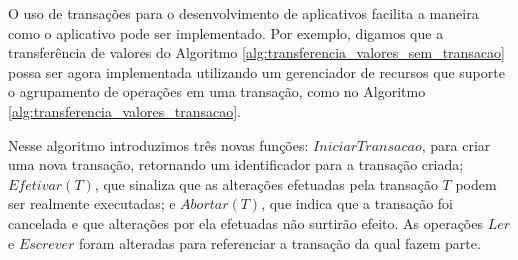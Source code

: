 \documentclass[11pt,twoside,a4paper]{book}
\begin{document}

O uso de transações para o desenvolvimento de aplicativos facilita a maneira como o aplicativo pode ser implementado. Por exemplo, digamos que a transferência de valores do Algoritmo \ref{alg:transferencia_valores_sem_transacao} possa ser agora implementada utilizando um gerenciador de recursos que suporte o agrupamento de operações em uma transação, como no Algoritmo \ref{alg:transferencia_valores_transacao}. 

Nesse algoritmo introduzimos três novas funções: $IniciarTransacao$, para criar uma nova transação, retornando um identificador para a transação criada; $Efetivar(T)$, que sinaliza que as alterações efetuadas pela transação $T$ podem ser realmente executadas; e $Abortar(T)$, que indica que a transação foi cancelada e que alterações por ela efetuadas não surtirão efeito. As operações $Ler$ e $Escrever$ foram alteradas para referenciar a transação da qual fazem parte.
\end{document}
